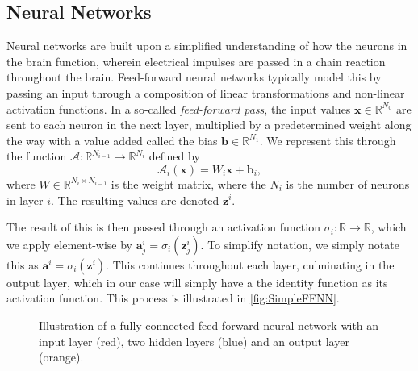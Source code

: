 \subsection{Neural Networks}
Neural networks are built upon a simplified understanding of how the neurons in the brain function, wherein electrical impulses are passed in a chain reaction throughout the brain. Feed-forward neural networks typically model this by passing an input through a composition of linear transformations and non-linear activation functions. In a so-called \textit{feed-forward pass}, the input values $\boldsymbol{x} \in \mathbb{R}^{N_0}$ are sent to each neuron in the next layer, multiplied by a predetermined weight along the way with a value added called the bias $\boldsymbol{b} \in \mathbb{R}^{N_1}$. We represent this through the function $\mathcal{A} : \mathbb{R}^{N_{i-1}} \to \mathbb{R}^{N_{i}}$ defined by
\begin{equation}
    \mathcal{A}_i(\boldsymbol{x}) = W_i \boldsymbol{x} + \boldsymbol{b}_i,
\end{equation}
where $W \in \mathbb{R}^{N_i \times N_{i-1}}$ is the weight matrix, where the $N_i$ is the number of neurons in layer $i$. The resulting values are denoted $\boldsymbol{z}^i$.

The result of this is then passed through an activation function $\sigma_i : \mathbb{R} \to \mathbb{R}$, which we apply element-wise by $\boldsymbol{a}^i_j = \sigma_i (\boldsymbol{z}^i_j)$. To simplify notation, we simply notate this as $\boldsymbol{a}^i = \sigma_i(\boldsymbol{z}^i)$. This continues throughout each layer, culminating in the output layer, which in our case will simply have a the identity function as its activation function. This process is illustrated in \autoref{fig:SimpleFFNN}.

\begin{figure}[h]
\centering

\caption{Illustration of a fully connected feed-forward neural network with an input layer (red), two hidden layers (blue) and an output layer (orange).}
\label{fig:SimpleFFNN}
\end{figure}

